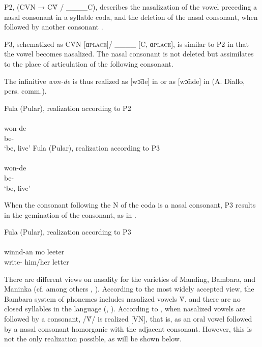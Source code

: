 \documentclass[output=paper]{langscibook}
\begin{document}
P2, (CVN → CṼ / \/ \_\_\_\_C), describes the nasalization of the vowel preceding a nasal consonant in a syllable coda, and the deletion of the nasal consonant, when followed by another consonant \citep[44]{diallo_grammaire_2000}. 

P3, schematized as CṼN [ɑ\textsc{place}]/ \/\_\_\_\_ [C, ɑ\textsc{place}], is similar to P2 in that the vowel becomes nasalized. The nasal consonant is not deleted but assimilates to the place of articulation of the following consonant.

The infinitive \textit{won-de} is thus realized as [wɔ̃de] in  or as [wɔ̃nde] in  (A. Diallo, pers. comm.).

\begin{exe}
    \ex\label{fanego:ex:24} Fula (Pular), realization according to P2 \\
    \glll [ˈwɔ̃de] \\
    won-de \\
    be-\Inf{} \\
    \glt ‘be, live’
    \ex\label{fanego:ex:25} Fula (Pular), realization according to P3 \\
     \\
    won-de \\
    be-\Inf{} \\
    \glt ‘be, live’
\end{exe}

\noindent
When the consonant following the N of the coda is a nasal consonant, P3 results in the gemination of the consonant, as in .

\begin{exe}
    \ex\label{fanego:ex:26} Fula (Pular), realization according to P3 \\
     {}\\
    winnd-an mo leeter \\
    write-\BEN{} him/her letter \\
\end{exe}

\noindent
There are different views on nasality for the varieties of Manding, Bambara, and Maninka (cf. among others \citealt{creissels_malinke_2009}, \citealt{vydrin_vowel_2020}). According to the most widely accepted view, the Bambara system of phonemes includes nasalized vowels Ṽ, and there are no closed syllables in the language (\citealt[18]{dumestre_grammaire_2003}, \citealt{vydrin_cours_2019}). According to \citet[17]{vydrin_cours_2019}, when nasalized vowels are followed by a consonant, /Ṽ/ is realized [VN], that is, as an oral vowel followed by a nasal consonant homorganic with the adjacent consonant. However, this is not the only realization possible, as will be shown below. 
\end{document}

